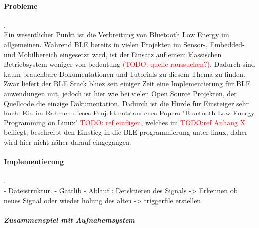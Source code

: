 \paragraph{Probleme}. \\ 
Ein wesentlicher Punkt ist die Verbreitung von Bluetooth Low Energy im allgemeinen. Während BLE bereits in vielen Projekten im Sensor-, Embedded- und Mobilbereich eingesetzt wird, ist der Einsatz auf einem klassischen Betriebsystem weniger von bedeutung \textcolor{red}{(TODO: quelle raussuchen?)}. Dadurch sind kaum brauchbare Dokumentationen und Tutorials zu diesem Thema zu finden. Zwar liefert der BLE Stack bluez seit einiger Zeit eine Implementierung für BLE anwendungen mit, jedoch ist hier wie bei vielen Open Source Projekten, der Quellcode die einzige Dokumentation. Dadurch ist die Hürde für Einsteiger sehr hoch. Ein im Rahmen dieses Projekt entstandenes Papers "Bluetooth Low Energy Programming on Linux"  \textcolor{red}{TODO: ref einfügen}, welches im  \textcolor{red}{TODO:ref  Anhang X} beiliegt, beschreibt den Einstieg in die BLE programmierung unter linux, daher wird hier nicht näher darauf eingegangen. 

\paragraph{Implementierung}. \\

- Dateistruktur.
- Gattlib
- Ablauf : Detektieren des Signals -> Erkennen ob neues Signal oder wieder holung des alten
  -> triggerfile erstellen.
  


\subparagraph{Zusammenspiel mit Aufnahemsystem}
